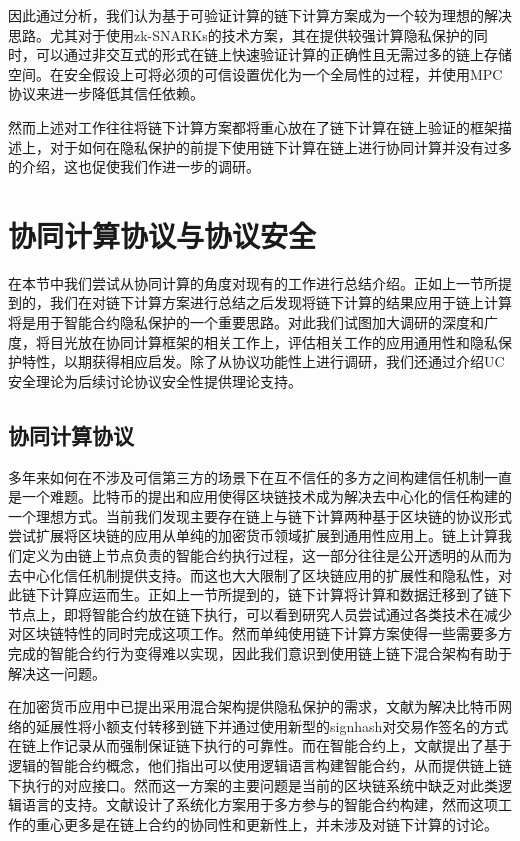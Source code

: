 因此通过分析，我们认为基于可验证计算的链下计算方案成为一个较为理想的解决思路。尤其对于使用zk-SNARKs的技术方案，其在提供较强计算隐私保护的同时，可以通过非交互式的形式在链上快速验证计算的正确性且无需过多的链上存储空间。在安全假设上可将必须的可信设置优化为一个全局性的过程，并使用MPC协议来进一步降低其信任依赖。

然而上述对工作往往将链下计算方案都将重心放在了链下计算在链上验证的框架描述上，对于如何在隐私保护的前提下使用链下计算在链上进行协同计算并没有过多的介绍，这也促使我们作进一步的调研。

\section{协同计算协议与协议安全}
 在本节中我们尝试从协同计算的角度对现有的工作进行总结介绍。正如上一节所提到的，我们在对链下计算方案进行总结之后发现将链下计算的结果应用于链上计算将是用于智能合约隐私保护的一个重要思路。对此我们试图加大调研的深度和广度，将目光放在协同计算框架的相关工作上，评估相关工作的应用通用性和隐私保护特性，以期获得相应启发。除了从协议功能性上进行调研，我们还通过介绍UC安全理论为后续讨论协议安全性提供理论支持。
\subsection{协同计算协议}
多年来如何在不涉及可信第三方的场景下在互不信任的多方之间构建信任机制一直是一个难题。比特币\cite{bitcoin}的提出和应用使得区块链技术成为解决去中心化的信任构建的一个理想方式。当前我们发现主要存在链上与链下计算两种基于区块链的协议形式尝试扩展将区块链的应用从单纯的加密货币领域扩展到通用性应用上。链上计算我们定义为由链上节点负责的智能合约执行过程，这一部分往往是公开透明的从而为去中心化信任机制提供支持。而这也大大限制了区块链应用的扩展性和隐私性，对此链下计算应运而生。正如上一节所提到的，链下计算将计算和数据迁移到了链下节点上，即将智能合约放在链下执行，可以看到研究人员尝试通过各类技术在减少对区块链特性的同时完成这项工作。然而单纯使用链下计算方案使得一些需要多方完成的智能合约行为变得难以实现，因此我们意识到使用链上链下混合架构有助于解决这一问题。

在加密货币应用\cite{bitcoinbook}中已提出采用混合架构提供隐私保护的需求，文献\cite{poon2016bitcoin}为解决比特币网络的延展性将小额支付转移到链下并通过使用新型的signhash对交易作签名的方式在链上作记录从而强制保证链下执行的可靠性。而在智能合约上，文献\cite{idelberger2016evaluation}提出了基于逻辑的智能合约概念，他们指出可以使用逻辑语言构建智能合约，从而提供链上链下执行的对应接口。然而这一方案的主要问题是当前的区块链系统中缺乏对此类逻辑语言的支持。文献\cite{9823371}设计了系统化方案用于多方参与的智能合约构建，然而这项工作的重心更多是在链上合约的协同性和更新性上，并未涉及对链下计算的讨论。


